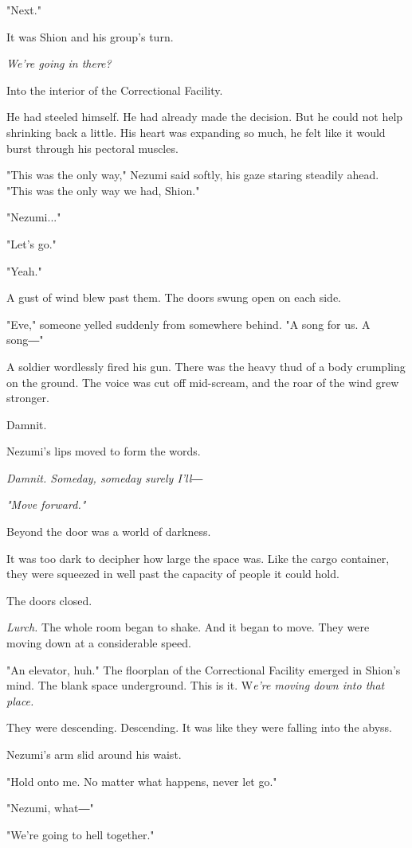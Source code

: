 "Next."

It was Shion and his group's turn.

\emph{We're going in there?}

Into the interior of the Correctional Facility.

He had steeled himself. He had already made the decision. But he could
not help shrinking back a little. His heart was expanding so much, he
felt like it would burst through his pectoral muscles.

"This was the only way," Nezumi said softly, his gaze staring steadily
ahead. "This was the only way we had, Shion."

"Nezumi..."

"Let's go."

"Yeah."

A gust of wind blew past them. The doors swung open on each side.

"Eve," someone yelled suddenly from somewhere behind. "A song for us. A
song―"

A soldier wordlessly fired his gun. There was the heavy thud of a body
crumpling on the ground. The voice was cut off mid-scream, and the roar
of the wind grew stronger.

Damnit.

Nezumi's lips moved to form the words.

\emph{Damnit. Someday, someday surely I'll―}

\emph{"Move forward."}

Beyond the door was a world of darkness.

It was too dark to decipher how large the space was. Like the cargo
container, they were squeezed in well past the capacity of people it
could hold.

The doors closed.

\emph{Lurch.} The whole room began to shake. And it began to move. They
were moving down at a considerable speed.

"An elevator, huh." The floorplan of the Correctional Facility emerged
in Shion's mind. The blank space underground. This is it. W\emph{e're
moving down into that place.}

They were descending. Descending. It was like they were falling into the
abyss.

Nezumi's arm slid around his waist.

"Hold onto me. No matter what happens, never let go."

"Nezumi, what―"

"We're going to hell together."

